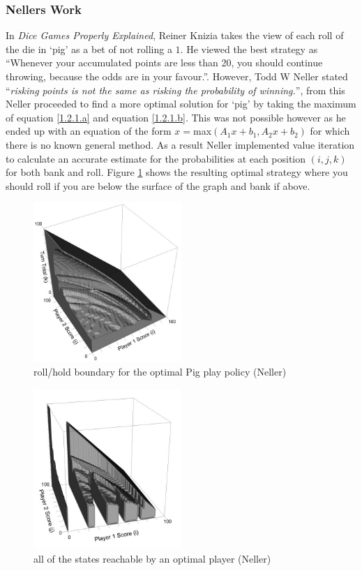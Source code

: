 \documentclass[a4paper,titlepage]{article}
\begin{document}
\subsubsection{Nellers Work}
In \textit{Dice Games Properly Explained}, Reiner Knizia takes the view of each roll of the die in `pig' as a bet of not rolling a $1$. He viewed the best strategy as ``Whenever your accumulated points are less than 20, you should continue throwing, because the odds are in your favour.''\cite{knizia2010dice}. However, Todd W Neller stated ``\textit{risking points is not the same as risking the probability of winning.}''\cite{neller2004optimal}, from this Neller proceeded to find a more optimal solution for `pig' by taking the maximum of equation \ref{1.2.1.a} and equation \ref{1.2.1.b}. This was not possible however as he ended up with an equation of the form $x=$max$ (A_1 x+b_1,A_2 x+b_2)$ for which there is no known general method. As a result Neller implemented value iteration to calculate an accurate estimate for the probabilities at each position $(i,j,k)$ for both bank and roll. Figure \ref{figure1} shows the resulting optimal strategy where you should roll if you are below the surface of the graph and bank if above.

\begin{figure}
\centering
\includegraphics[width=0.5\textwidth]{neller_optimal_solution}
\caption{roll\slash hold boundary for the optimal Pig play policy (Neller)\label{figure1}}
\end{figure}
\begin{figure}
\centering
\includegraphics[width=0.5\textwidth]{neller_optimal_solution_2}
\caption{all of the states reachable by an optimal player (Neller)\label{figure2}}
\end{figure}
\end{document}
